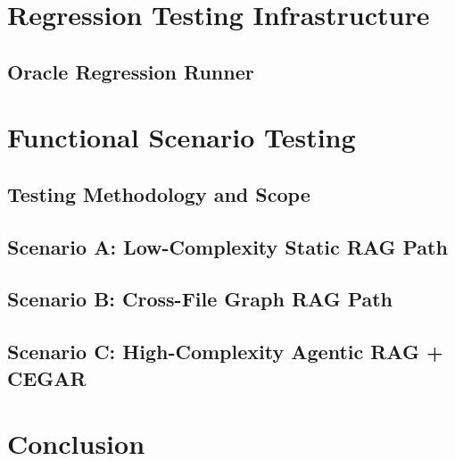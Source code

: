 \documentclass[12pt,a4paper]{report}
\begin{document}
\section{Regression Testing Infrastructure}
\label{sec:regression-impl}

  \subsection{Oracle Regression Runner}
  \label{subsec:regression-runner-impl}

\section{Functional Scenario Testing}
\label{sec:scenario-testing}

  \subsection{Testing Methodology and Scope}
  \label{subsec:test-methodology}

  \subsection{Scenario A: Low-Complexity Static RAG Path}
  \label{subsec:scenario-a}

  \subsection{Scenario B: Cross-File Graph RAG Path}
  \label{subsec:scenario-b}

  \subsection{Scenario C: High-Complexity Agentic RAG + CEGAR}
  \label{subsec:scenario-c}

\section{Conclusion}
\label{sec:ch5-conclusion}


\end{document}
